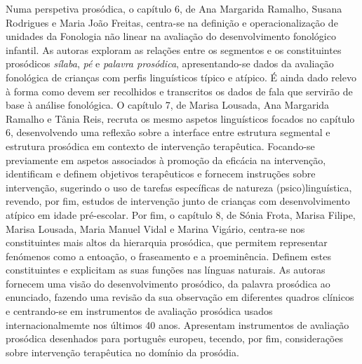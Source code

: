 \begin{refsection}
Numa perspetiva prosódica, o capítulo 6, de Ana Margarida Ramalho, Susana Rodrigues e Maria João Freitas, centra-se na definição e operacionalização de unidades da Fonologia não linear na avaliação do desenvolvimento fonológico infantil. As autoras exploram as relações entre os segmentos e os constituintes prosódicos \emph{sílaba}, \emph{pé} e \emph{palavra prosódica}, apresentando-se dados da avaliação fonológica de crianças com perfis linguísticos típico e atípico. É ainda dado relevo à forma como devem ser recolhidos e transcritos os dados de fala que servirão de base à análise fonológica. O capítulo 7, de Marisa Lousada, Ana Margarida Ramalho e Tânia Reis, recruta os mesmo aspetos linguísticos focados no capítulo 6, desenvolvendo uma reflexão sobre a interface entre estrutura segmental e estrutura prosódica em contexto de intervenção terapêutica. Focando-se previamente em aspetos associados à promoção da eficácia na intervenção, identificam e definem objetivos terapêuticos e fornecem instruções sobre intervenção, sugerindo o uso de tarefas específicas de natureza (psico)linguística, revendo, por fim, estudos de intervenção junto de crianças com desenvolvimento atípico em idade pré-escolar. Por fim, o capítulo 8, de Sónia Frota, Marisa Filipe, Marisa Lousada, Maria Manuel Vidal e Marina Vigário, centra-se nos constituintes mais altos da hierarquia prosódica, que permitem representar fenómenos como a entoação, o fraseamento e a proeminência. Definem estes constituintes e explicitam as suas funções nas línguas naturais. As autoras fornecem uma visão do desenvolvimento prosódico, da palavra prosódica ao enunciado, fazendo uma revisão da sua observação em diferentes quadros clínicos e centrando-se em instrumentos de avaliação prosódica usados internacionalmemte nos últimos 40 anos. Apresentam instrumentos de avaliação prosódica desenhados para português europeu, tecendo, por fim, considerações sobre intervenção terapêutica no domínio da prosódia.


\end{refsection}
